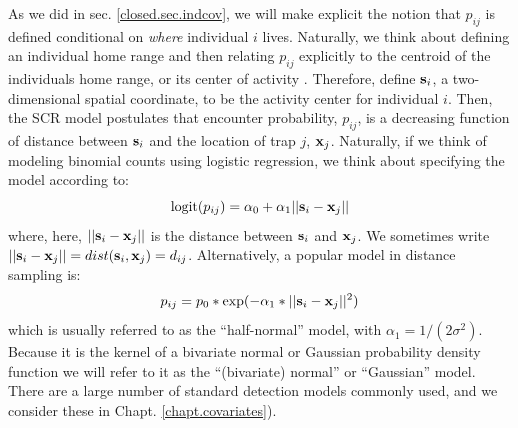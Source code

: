As we did in sec. \ref{closed.sec.indcov}, we will make explicit the
notion that $p_{ij}$ is defined conditional on {\it where} individual
$i$ lives. Naturally, we think about defining an individual home range
and then relating $p_{ij}$ explicitly to the centroid of the
individuals home range, or its center of activity \citep{efford:2004,
  borchers_efford:2008, royle_young:2008}.  Therefore, define ${\bf
  s}_{i}$, a two-dimensional spatial coordinate, to be the activity
center for individual $i$. Then, the SCR model postulates that
encounter probability, $p_{ij}$, is a decreasing function of distance
between ${\bf s}_{i}$ and the location of trap $j$, ${\bf x}_{j}$.
Naturally, if we think of modeling binomial counts using logistic
regression, we think about specifying the model according to:
\begin{equation}
	\mbox{logit}(p_{ij}) = \alpha_{0} + \alpha_1 ||{\bf s}_{i}-{\bf x}_{j} ||
\label{scr0.eq.logit}
\end{equation}
where, here, $||{\bf s}_{i}-{\bf x}_{j}||$ is the distance between
${\bf s}_{i}$ and ${\bf x}_{j}$. We sometimes write $||{\bf
  s}_{i}-{\bf x}_{j}|| = dist({\bf s}_{i},{\bf x}_{j}) =
d_{ij}$. Alternatively, a popular model in distance sampling is:
\begin{equation}
p_{ij} = p_{0}*\exp(-\alpha_{1} *||{\bf s}_{i}-{\bf x}_{j}||^2)
\label{scr0.eq.norm}
\end{equation}
which is usually referred to as the ``half-normal'' model,
with $\alpha_{1} = 1/(2\sigma^{2})$.  Because it
is the kernel of a bivariate normal or Gaussian probability density
function we will refer to it as the ``(bivariate) normal'' or
``Gaussian'' model.  There are a large number of standard detection
models commonly used, and we consider these in
Chapt. \ref{chapt.covariates}). 
